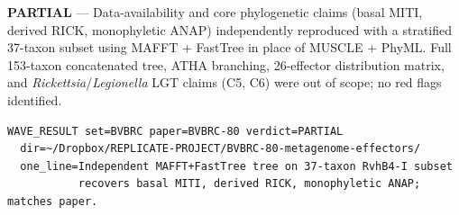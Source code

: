 \documentclass[11pt,letterpaper]{article}
\begin{document}
\textbf{PARTIAL} --- Data-availability and core phylogenetic claims (basal MITI,
derived RICK, monophyletic ANAP) independently reproduced with a stratified 37-taxon
subset using MAFFT + FastTree in place of MUSCLE + PhyML. Full 153-taxon concatenated tree,
ATHA branching, 26-effector distribution matrix, and \emph{Rickettsia}/\emph{Legionella}
LGT claims (C5, C6) were out of scope; no red flags identified.

\begin{Verbatim}[fontsize=\small]
WAVE_RESULT set=BVBRC paper=BVBRC-80 verdict=PARTIAL
  dir=~/Dropbox/REPLICATE-PROJECT/BVBRC-80-metagenome-effectors/
  one_line=Independent MAFFT+FastTree tree on 37-taxon RvhB4-I subset
           recovers basal MITI, derived RICK, monophyletic ANAP; matches paper.
\end{Verbatim}
\end{document}
